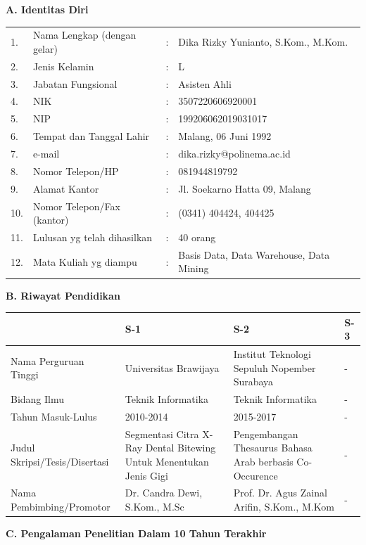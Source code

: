 \textbf{A. Identitas Diri}

{\footnotesize
\begin{longtable}{@{}p{0.8cm}p{6cm}p{0.3cm}p{8cm}}
1. & Nama Lengkap (dengan gelar) & : & Dika Rizky Yunianto, S.Kom., M.Kom. \\
2. & Jenis Kelamin & : & L \\
3. & Jabatan Fungsional & : & Asisten Ahli \\
4. & NIK & : & 3507220606920001 \\
5. & NIP & : & 199206062019031017 \\
6. & Tempat dan Tanggal Lahir & : & Malang, 06 Juni 1992 \\
7. & e-mail & : & dika.rizky@polinema.ac.id \\
8. & Nomor Telepon/HP & : & 081944819792 \\
9. & Alamat Kantor & : & Jl. Soekarno Hatta 09, Malang \\
10. & Nomor Telepon/Fax (kantor) & : & (0341) 404424, 404425 \\
11. & Lulusan yg telah dihasilkan & : & 40 orang \\
12. & Mata Kuliah yg diampu & : & Basis Data, Data Warehouse, Data Mining \\
\end{longtable}
}

\textbf{B. Riwayat Pendidikan}

{\footnotesize
\begin{longtable}{|p{3.5cm}|p{5cm}|p{5cm}|p{1.5cm}|}
\hline
& \textbf{S-1} & \textbf{S-2} & \textbf{S-3} \\
\hline
Nama Perguruan Tinggi & Universitas Brawijaya & Institut Teknologi Sepuluh Nopember Surabaya & - \\
\hline
Bidang Ilmu & Teknik Informatika & Teknik Informatika & - \\
\hline
Tahun Masuk-Lulus & 2010-2014 & 2015-2017 & - \\
\hline
Judul Skripsi/Tesis/Disertasi & Segmentasi Citra X-Ray Dental Bitewing Untuk Menentukan Jenis Gigi & Pengembangan Thesaurus Bahasa Arab berbasis Co-Occurence & - \\
\hline
Nama Pembimbing/Promotor & Dr. Candra Dewi, S.Kom., M.Sc & Prof. Dr. Agus Zainal Arifin, S.Kom., M.Kom & - \\
\hline
\end{longtable}
}

\textbf{C. Pengalaman Penelitian Dalam 10 Tahun Terakhir}

